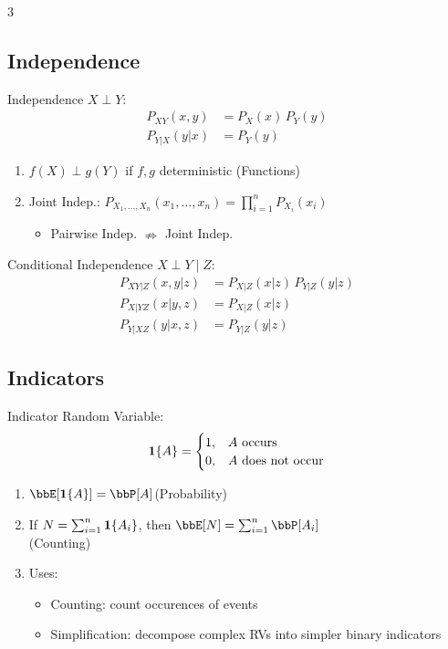 \documentclass[12pt, a4paper]{article}
\begin{document}
\begin{multicols*}{3}
\subsection{Independence}
Independence $X \perp Y$:
\begin{align*}
  P_{XY}(x,y) &= P_X(x)\,P_Y(y)\\
  P_{Y|X}(y|x) &= P_Y(y)
\end{align*}
\begin{enumerate}[\roman*.]
  \item $f(X)\perp g(Y)$ if $f,g$ deterministic \hfill(Functions)
  \item Joint Indep.: $P_{X_1,\ldots,X_n}(x_1,\ldots,x_n)=\prod_{i=1}^n P_{X_i}(x_i)$
    \begin{itemize}[leftmargin=*]\vspace{3pt }
      \item Pairwise Indep. $\nRightarrow$ Joint Indep.
    \end{itemize}
\end{enumerate}

Conditional Independence $X \perp Y \mid Z$:
\begin{align*}
  P_{XY|Z}(x,y|z) &= P_{X|Z}(x|z)\,P_{Y|Z}(y|z)\\
  P_{X|YZ}(x|y,z) &= P_{X|Z}(x|z)\\
  P_{Y|XZ}(y|x,z) &= P_{Y|Z}(y|z)
\end{align*}

\subsection{Indicators}
Indicator Random Variable:
\begin{align*}
  \mathbf{1}{\{A\}} = 
  \begin{cases}
    1,& A \text{ occurs}\\
    0,& A \text{ does not occur}
  \end{cases}
\end{align*}
\begin{enumerate}[\roman*.]
  \item $\E[\1{A}] = \Pr[A]$\hfill(Probability)
  \item If $N=\sum_{i=1}^n \mathbf{1}{\{A_i\}}$, then $\E[N]=\sum_{i=1}^n \Pr[A_i]$\\\hfill(Counting)
  \item Uses:
    \begin{itemize}[leftmargin=*]\vspace{3pt}
      \item Counting: count occurences of events
      \item Simplification: decompose complex RVs into simpler binary indicators
    \end{itemize}
\end{enumerate}


\end{multicols*}
\end{document}
